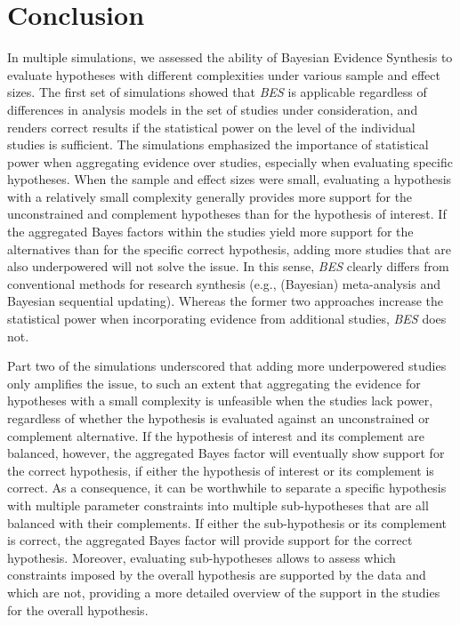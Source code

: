 \documentclass[review, 3p, authoryear]{elsarticle} %
\begin{document}
\hypertarget{conclusion}{%
\section{Conclusion}\label{conclusion}}

In multiple simulations, we assessed the ability of Bayesian Evidence Synthesis to evaluate hypotheses with different complexities under various sample and effect sizes.
The first set of simulations showed that \emph{BES} is applicable regardless of differences in analysis models in the set of studies under consideration, and renders correct results if the statistical power on the level of the individual studies is sufficient.
The simulations emphasized the importance of statistical power when aggregating evidence over studies, especially when evaluating specific hypotheses.
When the sample and effect sizes were small, evaluating a hypothesis with a relatively small complexity generally provides more support for the unconstrained and complement hypotheses than for the hypothesis of interest.
If the aggregated Bayes factors within the studies yield more support for the alternatives than for the specific correct hypothesis, adding more studies that are also underpowered will not solve the issue.
In this sense, \emph{BES} clearly differs from conventional methods for research synthesis (e.g., (Bayesian) meta-analysis and Bayesian sequential updating).
Whereas the former two approaches increase the statistical power when incorporating evidence from additional studies, \emph{BES} does not.

Part two of the simulations underscored that adding more underpowered studies only amplifies the issue, to such an extent that aggregating the evidence for hypotheses with a small complexity is unfeasible when the studies lack power, regardless of whether the hypothesis is evaluated against an unconstrained or complement alternative.
If the hypothesis of interest and its complement are balanced, however, the aggregated Bayes factor will eventually show support for the correct hypothesis, if either the hypothesis of interest or its complement is correct.
As a consequence, it can be worthwhile to separate a specific hypothesis with multiple parameter constraints into multiple sub-hypotheses that are all balanced with their complements.
If either the sub-hypothesis or its complement is correct, the aggregated Bayes factor will provide support for the correct hypothesis.
Moreover, evaluating sub-hypotheses allows to assess which constraints imposed by the overall hypothesis are supported by the data and which are not, providing a more detailed overview of the support in the studies for the overall hypothesis.
\end{document}
